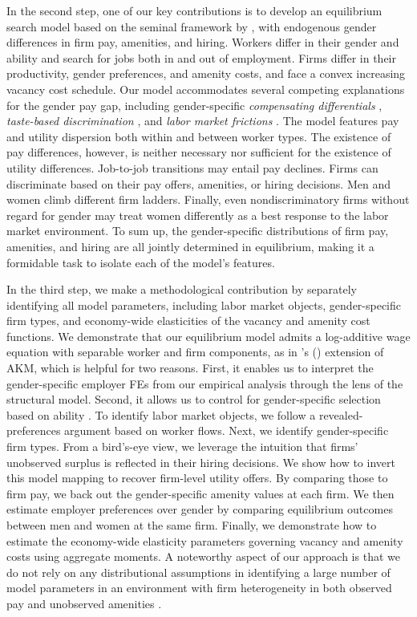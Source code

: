 In the second step, one of our key contributions is to develop an equilibrium search model based on the seminal framework by \citet{BurdettMortensen1998}, with endogenous gender differences in firm pay, amenities, and hiring. Workers differ in their gender and ability and search for jobs both in and out of employment. Firms differ in their productivity, gender preferences, and amenity costs, and face a convex increasing vacancy cost schedule. %
%
Our model accommodates several competing explanations for the gender pay gap, including gender-specific \emph{compensating differentials} \citep{Rosen1986}, \emph{taste-based discrimination} \citep{becker1971}, and \emph{labor market frictions} \citep{Manning2003}. %
%
The model features pay and utility dispersion both within and between worker types. The existence of pay differences, however, is neither necessary nor sufficient for the existence of utility differences. Job-to-job transitions may entail pay declines. Firms can discriminate based on their pay offers, amenities, or hiring decisions. Men and women climb different firm ladders. Finally, even nondiscriminatory firms without regard for gender may treat women differently as a best response to the labor market environment. %
%
To sum up, the gender-specific distributions of firm pay, amenities, and hiring are all jointly determined in equilibrium, making it a formidable task to isolate each of the model's features.

In the third step, we make a methodological contribution by separately identifying all model parameters, including labor market objects, gender-specific firm types, and economy-wide elasticities of the vacancy and amenity cost functions. %
%
We demonstrate that our equilibrium model admits a log-additive wage equation with separable worker and firm components, as in \citeauthor{CardCardosoKline2016}'s (\citeyear{CardCardosoKline2016}) extension of AKM, which is helpful for two reasons. First, it enables us to interpret the gender-specific employer FEs from our empirical analysis through the lens of the structural model. Second, it allows us to control for gender-specific selection based on ability \citep{MulliganRubinstein2008}. %
%
To identify labor market objects, we follow a revealed-preferences argument based on worker flows. %
%
Next, we identify gender-specific firm types. From a bird's-eye view, we leverage the intuition that firms' unobserved surplus is reflected in their hiring decisions. We show how to invert this model mapping to recover firm-level utility offers. By comparing those to firm pay, we back out the gender-specific amenity values at each firm. We then estimate employer preferences over gender by comparing equilibrium outcomes between men and women at the same firm. %
%
Finally, we demonstrate how to estimate the economy-wide elasticity parameters governing vacancy and amenity costs using aggregate moments. %
%
A noteworthy aspect of our approach is that we do not rely on any distributional assumptions in identifying a large number of model parameters in an environment with firm heterogeneity in both observed pay and unobserved amenities \citep[cf.][]{BontempsRobinvandenBerg1999, BontempsRobinvandenBerg2000}.

